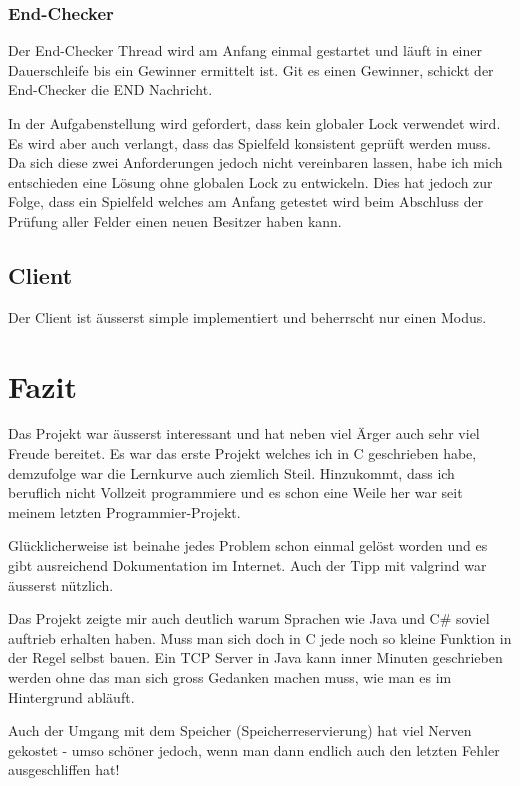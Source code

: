 \subsection{End-Checker}
Der End-Checker Thread wird am Anfang einmal gestartet und läuft in einer Dauerschleife bis ein Gewinner ermittelt ist. Git es einen Gewinner, schickt der End-Checker die END Nachricht.

In der Aufgabenstellung wird gefordert, dass kein globaler Lock verwendet wird. Es wird aber auch verlangt, dass das Spielfeld konsistent geprüft werden muss. Da sich diese zwei Anforderungen jedoch nicht vereinbaren lassen, habe ich mich entschieden eine Lösung ohne globalen Lock zu entwickeln. Dies hat jedoch zur Folge, dass ein Spielfeld welches am Anfang getestet wird beim Abschluss der Prüfung aller Felder einen neuen Besitzer haben kann.

\section{Client}
Der Client ist äusserst simple implementiert und beherrscht nur einen Modus.

\chapter{Fazit}
Das Projekt war äusserst interessant und hat neben viel Ärger auch sehr viel Freude bereitet. Es war das erste Projekt welches ich in C geschrieben habe, demzufolge war die Lernkurve auch ziemlich Steil. Hinzukommt, dass ich beruflich nicht Vollzeit programmiere und es schon eine Weile her war seit meinem letzten Programmier-Projekt.

Glücklicherweise ist beinahe jedes Problem schon einmal gelöst worden und es gibt ausreichend Dokumentation im Internet. Auch der Tipp mit valgrind war äusserst nützlich. 

Das Projekt zeigte mir auch deutlich warum Sprachen wie Java und C\# soviel auftrieb erhalten haben. Muss man sich doch in C jede noch so kleine Funktion in der Regel selbst bauen. Ein TCP Server in Java kann inner Minuten geschrieben werden ohne das man sich gross Gedanken machen muss, wie man es im Hintergrund abläuft.

Auch der Umgang mit dem Speicher (Speicherreservierung) hat viel Nerven gekostet - umso schöner jedoch, wenn man dann endlich auch den letzten Fehler ausgeschliffen hat!